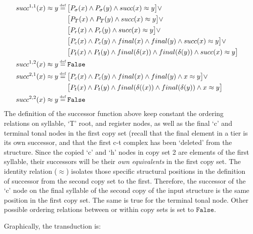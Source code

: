 \documentclass{article}
\newcommand\myeq{\mathrel{\stackrel{\makebox[0pt]{\mbox{\normalfont\tiny def}}}{=}}}
\newcommand{\ap}{\approx}
\begin{document}
\begin{equation}
\begin{aligned}
succ^{1,1}(x)\ap y&\myeq \big[ P_{\sigma}(x)\land P_{\sigma}(y)\land succ(x)\ap y\big]\lor \\
&\quad \, \, \big[ P_{T}(x)\land P_{T}(y)\land succ(x)\ap y\big]\lor \\
&\quad \, \, \big[ P_{r}(x)\land P_{r}(y)\land succ(x)\ap y\big]\lor \\
&\quad \, \, \big[ P_{c}(x)\land P_{c}(y)\land final(x) \land final(y) \land succ(x)\ap y\big]\lor \\
&\quad \, \, \big[ P_{t}(x)\land P_{t}(y)\land final(\delta(x))\land final(\delta(y))\land succ(x)\ap y\big]\\
succ^{1,2}(x)\ap y&\myeq\mathtt{False} \\
succ^{2,1}(x)\ap y&\myeq \big[P_{c}(x) \land P_{c}(y) \land final(x) \land final(y)\land x\ap y\big] \lor \\
&\quad \, \, \big[P_{t}(x)\land P_{t}(y)\land final(\delta((x)) \land final(\delta(y))\land x\ap y\big] \\
succ^{2,2}(x)\ap y&\myeq \mathtt{False}
\end{aligned}
\end{equation}
The definition of the successor function above keep constant the ordering relations on syllable, `T' root, and register nodes, as well as the final `c' and terminal tonal nodes in the first copy set (recall that the final element in a tier is its own successor, and that the first c-t complex has been `deleted' from the structure. Since the copied `c' and `h' nodes in copy set 2 are elements of the first syllable, their successors will be their \emph{own equivalents} in the first copy set. The identity relation ($\ap$) isolates those specific structural positions in the definition of successor from the second copy set to the first. Therefore, the successor of the `c' node on the final syllable of the second copy of the input structure is the same position in the first copy set. The same is true for the terminal tonal node. Other possible ordering relations between or within copy sets is set to $\mathtt{False}$.  \par
Graphically, the transduction is:
\end{document}
